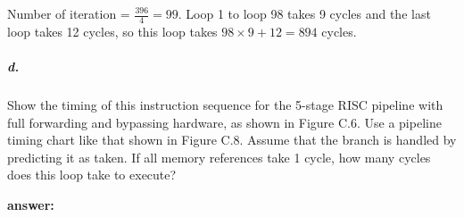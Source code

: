 \documentclass{article}
\begin{document}
\begin{figure}[!ht]
\end{figure}

Number of iteration = $\frac{396}{4}=99$. Loop 1 to loop 98 takes 9 cycles and the last loop takes 12 cycles, so this loop takes $98\times 9+12=894$ cycles.

\subparagraph{d.} Show the timing of this instruction sequence for the 5-stage RISC pipeline with full forwarding and bypassing hardware, as shown in Figure C.6. Use a pipeline timing chart like that shown in Figure C.8. Assume that the branch is handled by predicting it as taken. If all memory references take 1 cycle, how many cycles does this loop take to execute?

\noindent \textbf{answer:} 
\end{document}
